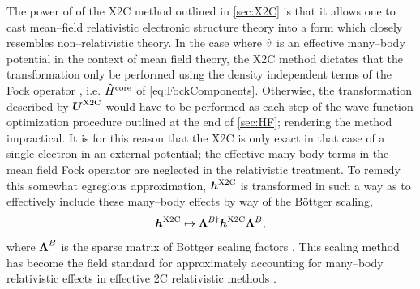 The power of of the X2C method outlined in \cref{sec:X2C} is that it allows one
to cast mean--field relativistic electronic structure theory into a form which closely 
resembles non--relativistic theory. 
In the case where $\hat{v}$ is an effective many--body potential in the context of mean field theory, the X2C method
dictates that the transformation only be performed using the density independent terms of the Fock operator ,
i.e. $\hat{H}^\mathrm{core}$ of \cref{eq:FockComponents}. Otherwise, the transformation described by $\boldsymbol{U}^{\mathrm{X2C}}$ would
have to be performed as each step of the wave function optimization procedure outlined at the end  of \cref{sec:HF};
rendering the method impractical. It is for this reason that the X2C is only exact in that case of a single electron
in an external potential; the effective many body terms in the mean field Fock operator are neglected in the 
relativistic treatment. To remedy this somewhat egregious approximation, $\boldsymbol{h}^{\mathrm{X2C}}$ is transformed in such a
way as to effectively include these many--body effects by way of the B\"{o}ttger  scaling,
\begin{equation}
  \label{eq:BScaling}
\boldsymbol{h}^{\mathrm{X2C}} \mapsto \boldsymbol{\Lambda}^{B\dagger} \boldsymbol{h}^{\mathrm{X2C}} \boldsymbol{\Lambda}^{B},
\end{equation}
where $\boldsymbol{\Lambda}^B$ is the sparse matrix of B\"{o}ttger scaling factors \cite{Boettger00_7809}. 
This scaling method
has become the field standard for approximately accounting for many--body relativistic effects in effective
2C relativistic methods .

